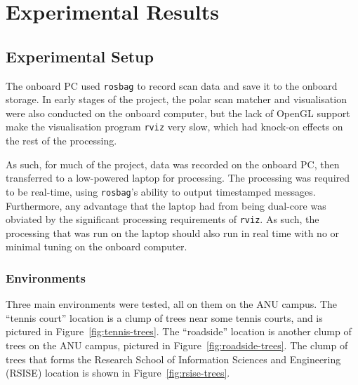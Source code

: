 \documentclass[12pt,oneside,a4paper]{book}
\begin{document}

\chapter{Experimental Results}
\label{cha:experimental-results}

\section{Experimental Setup}
\label{sec:experimental-setup}

The onboard PC used \texttt{rosbag} to record scan data and save it to
the onboard storage. In early stages of the project, the polar scan
matcher and visualisation were also conducted on the onboard computer,
but the lack of OpenGL support make the visualisation program
\texttt{rviz} very slow, which had knock-on effects on the rest of the
processing.

As such, for much of the project, data was recorded on the onboard PC,
then transferred to a low-powered laptop for processing. The
processing was required to be real-time, using \texttt{rosbag}'s
ability to output timestamped messages. Furthermore, any advantage
that the laptop had from being dual-core was obviated by the significant
processing requirements of \texttt{rviz}. As such, the processing that
was run on the laptop should also run in real time with no or minimal
tuning on the onboard computer.

\subsection{Environments}
\label{sec:environments}

Three main environments were tested, all on them on the ANU
campus. The ``tennis court'' location is a clump of trees near some
tennis courts, and is pictured in Figure~\ref{fig:tennis-trees}. The
``roadside'' location is another clump of trees on the ANU campus,
pictured in Figure~\ref{fig:roadside-trees}. The clump of trees that
forms the Research School of Information Sciences and Engineering
(RSISE) location is shown in Figure~\ref{fig:rsise-trees}.
\end{document}
